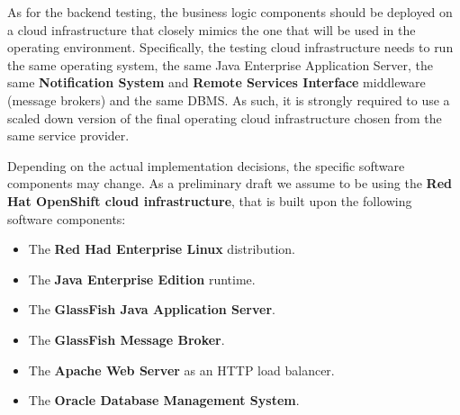 As for the backend testing, the business logic components should be deployed on a cloud infrastructure that closely mimics the one that will be used in the operating environment. 
Specifically, the testing cloud infrastructure needs to run the same operating system, the same Java Enterprise Application Server, the same \textbf{Notification System} and \textbf{Remote Services Interface} middleware (message brokers) and the same DBMS.
As such, it is strongly required to use a scaled down version of the final operating cloud infrastructure chosen from the same service provider. 

Depending on the actual implementation decisions, the specific software components may change. As a preliminary draft we assume to be using the \textbf{Red Hat OpenShift cloud infrastructure}, that is built upon the following software components:
\begin{itemize}
	\item The \textbf{Red Had Enterprise Linux} distribution.
	\item The \textbf{Java Enterprise Edition} runtime.
	\item The \textbf{GlassFish Java Application Server}.
	\item The \textbf{GlassFish Message Broker}.
	\item The \textbf{Apache Web Server} as an HTTP load balancer.
	\item The \textbf{Oracle Database Management System}.
\end{itemize}

